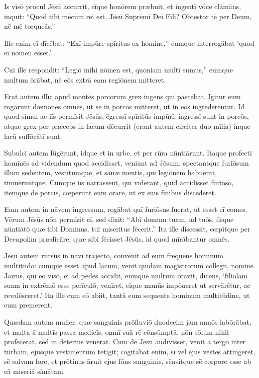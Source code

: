 \Versus Is vīsō procul Jēsū accurrit, eīque honōrem præbuit,
\Versus et ingentī vōce clāmāns, inquit: ``Quod tibi mēcum reī est, Jēsū Suprēmī Deī Fīlī? Obtestor tē per Deum, nē mē torqueās.''

\Versus Ille enim eī dīcēbat: ``Exī impūre spīritus ex homine,''
\Versus eumque interrogābat `quod eī nōmen esset.'

Cui ille respondit: ``Legiō mihi nōmen est, quoniam multī sumus,''
\Versus eumque multum ōrābat, nē eōs extrā eam regiōnem mitteret.

\Versus Erat autem illīc apud montēs porcōrum grex ingēns quī pāscēbat.
\Versus Igitur eum rogārunt dæmonēs omnēs, ut sē in porcōs mitteret, ut in eōs ingrederentur.
\Versus Id quod simul ac iīs permīsit Jēsūs, ēgressī spīritūs impūrī, ingressī sunt in porcōs, atque grex per præceps in lacum dēcurrit (erant autem circiter duo mīlia) inque lacū suffōcātī sunt.

\Versus Subulcī autem fūgērunt, idque et in urbe, et per rūra nūntiārunt. Itaque profectī hominēs ad videndum quod accidisset,
\Versus veniunt ad Jēsum, spectantque furiōsum illum sedentem, vestītumque, et sānæ mentis, quī legiōnem habuerat, timuēruntque.
\Versus Cumque iīs nārrāssent, quī vīderant, quid accidisset furiōsō, itemque dē porcīs,
\Versus cœpērunt eum ōrāre, ut ex suīs fīnibus discēderet.

\Versus Eum autem in nāvem ingressum, rogābat quī furiōsus fuerat, ut esset eī comes.
\Versus Vērum Jēsūs nōn permīsit eī, sed dīxit: ``Abī domum tuam, ad tuōs, iīsque nūntiātō quæ tibi Dominus, tuī miseritus fēcerit.''
\Versus Ita ille discessit, cœpitque per Decapolim prædicāre, quæ sibi fēcisset Jēsūs, id quod mīrābantur omnēs.

\Versus Jēsū autem rūrsus in nāvī trājectō, convēnit ad eum frequēns hominum multitūdō:
\Versus cumque esset apud lacum, vēnit quīdam magistrōrum collēgiī, nōmine Jaīrus, quī eō vīsō, eī ad pedēs accidit,
\Versus eumque multum ōrāvit, dīcēns, `fīliolam suam in extrēmō esse perīculō; venīret, eīque manūs impōneret ut servārētur, ac revalēsceret.'
\Versus Ita ille cum eō abiit, tantā eum sequente hominum multitūdine, ut eum premerent.

\Versus Quædam autem mulier, quæ sanguinis prōfluviō duodecim jam annōs labōrābat,
\Versus et multa ā multīs passa medicīs, omnī suā rē cōnsūmptā, nōn sōlum nihil prōfēcerat, sed in dēterius vēnerat.
\Versus Cum dē Jēsū audīvisset, vēnit ā tergō inter turbam, ejusque vestīmentum tetigit;
\Versus cōgitābat enim, sī vel ejus vestēs attingeret, sē salvam fore,
\Versus et prōtinus āruit ejus fōns sanguinis, sēnsitque sē corpore esse ab eā miseriā sānātam.

